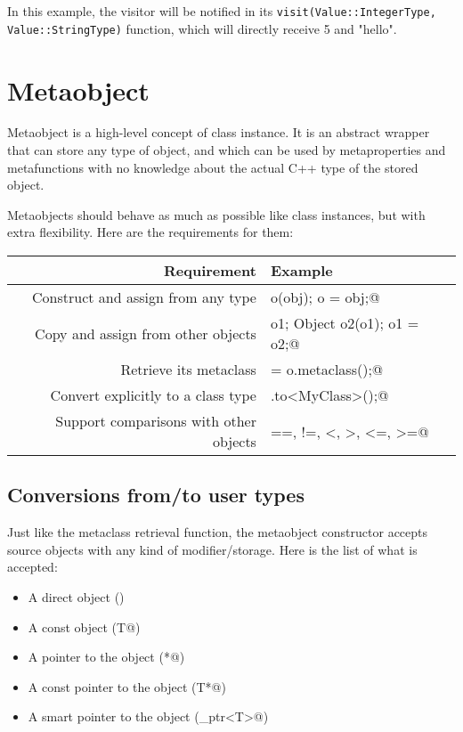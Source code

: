 \documentclass[a4paper, twoside]{report}
\begin{document}
	In this example, the visitor will be notified	in its
	\texttt{visit(Value::IntegerType, Value::StringType)} function,
	which will directly receive 5 and "hello".

\section{Metaobject}
\label{sec:metaobject}

	Metaobject is a high-level concept of class instance. It is an abstract wrapper that can
	store any type of object, and which can be used by metaproperties and metafunctions
	with no knowledge about the actual C++ type of the stored object.
	
	Metaobjects should behave as much as possible like class instances, but with extra flexibility.
	Here are the requirements for them:

	\begin{tabular}{r|l}
		\textbf{Requirement}										& \textbf{Example}													\\
		\hline
		Construct and assign from any type	 		& \verb@Object o(obj); o = obj;@ 						\\
		Copy and assign from other objects 			& \verb@Object o1; Object o2(o1); o1 = o2;@ \\
		Retrieve its metaclass 									& \verb@metaclass = o.metaclass();@ 				\\
		Convert explicitly to a class type			& \verb@o.to<MyClass>();@ 									\\
		Support comparisons with other objects	& \verb@ ==, !=, <, >, <=, >=@ 							\\
	\end{tabular}

\subsection{Conversions from/to user types}
\label{sec:metaobject-conversion}

	Just like the metaclass retrieval function, the metaobject constructor accepts source objects
	with any kind of modifier/storage. Here is the list of what is accepted:

	\begin{itemize}
		\item A direct object (\verb@T@)
		\item A const object (\verb@const T@)
		\item A pointer to the object (\verb@T*@)
		\item A const pointer to the object (\verb@const T*@)
		\item A smart pointer to the object (\verb@shared_ptr<T>@)
	\end{itemize}
	
\end{document}
